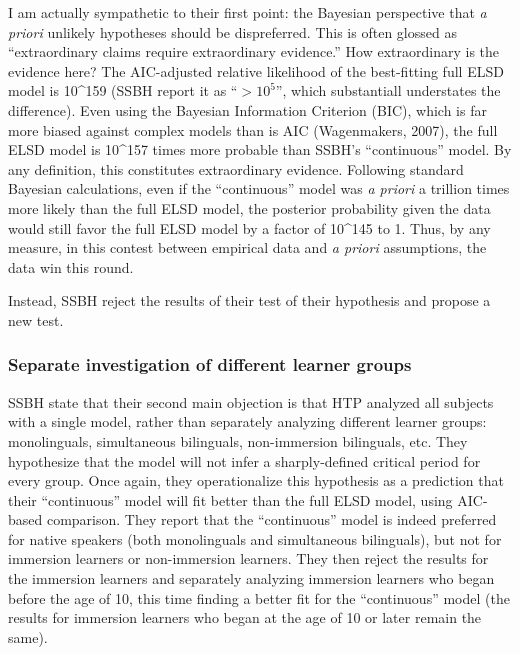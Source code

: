 \documentclass[
  english,
  doc,floatsintext]{apa6}
\begin{document}
I am actually sympathetic to their first point: the Bayesian perspective that \emph{a priori} unlikely hypotheses should be dispreferred. This is often glossed as ``extraordinary claims require extraordinary evidence.'' How extraordinary is the evidence here? The AIC-adjusted relative likelihood of the best-fitting full ELSD model is 10\^{}159 (SSBH report it as ``\(>10^5\)'', which substantiall understates the difference). Even using the Bayesian Information Criterion (BIC), which is far more biased against complex models than is AIC (Wagenmakers, 2007), the full ELSD model is 10\^{}157 times more probable than SSBH's ``continuous'' model. By any definition, this constitutes extraordinary evidence. Following standard Bayesian calculations, even if the ``continuous'' model was \emph{a priori} a trillion times more likely than the full ELSD model, the posterior probability given the data would still favor the full ELSD model by a factor of 10\^{}145 to 1. Thus, by any measure, in this contest between empirical data and \emph{a priori} assumptions, the data win this round.

Instead, SSBH reject the results of their test of their hypothesis and propose a new test.

\hypertarget{separate-investigation-of-different-learner-groups}{%
\subsubsection{Separate investigation of different learner groups}\label{separate-investigation-of-different-learner-groups}}

SSBH state that their second main objection is that HTP analyzed all subjects with a single model, rather than separately analyzing different learner groups: monolinguals, simultaneous bilinguals, non-immersion bilinguals, etc. They hypothesize that the model will not infer a sharply-defined critical period for every group. Once again, they operationalize this hypothesis as a prediction that their ``continuous'' model will fit better than the full ELSD model, using AIC-based comparison. They report that the ``continuous'' model is indeed preferred for native speakers (both monolinguals and simultaneous bilinguals), but not for immersion learners or non-immersion learners. They then reject the results for the immersion learners and separately analyzing immersion learners who began before the age of 10, this time finding a better fit for the ``continuous'' model (the results for immersion learners who began at the age of 10 or later remain the same).
\end{document}
